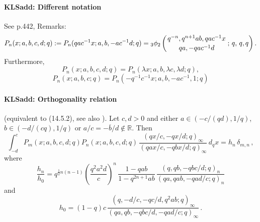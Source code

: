 \documentclass[envcountchap,graybox]{svmono}
\newcommand{\qhyp}[5]{\mbox{}_{#1}{\phi}_{#2}
\left(\genfrac{}{}{0pt}{}{#3}{#4}\,;\,q,\,#5\right)}
\newcommand\RR{\mathbb{R}}
\newcommand\de\delta
\newcommand\la\lambda
\newcommand\half{\frac12}
\newcommand\iy\infty
\newcommand{\qhyp}[5]{\,\mbox{}_{#1}\phi_{#2}\!\left(
  \genfrac{}{}{0pt}{}{#3}{#4};#5\right)}
\begin{document}
\paragraph{\large\bf KLSadd: Different notation}See p.442, Remarks:
\begin{equation}
P_n(x;a,b,c,d;q):=P_n(qac^{-1}x;a,b,-ac^{-1}d;q)
=\qhyp32{q^{-n},q^{n+1}ab,qac^{-1}x}{qa,-qac^{-1}d}{q,q}.
\label{123}
\end{equation}
Furthermore,
\begin{equation}
P_n(x;a,b,c,d;q)=P_n(\la x;a,b,\la c,\la d;q),
\label{141}
\end{equation}
\begin{equation}
P_n(x;a,b,c;q)=P_n(-q^{-1}c^{-1}x;a,b,-ac^{-1},1;q)
\label{142}
\end{equation}
%
\paragraph{\large\bf KLSadd: Orthogonality relation}(equivalent to (14.5.2), see also \cite[(2.42), (2.41), (2.36), (2.35)]{K17}).
Let $c,d>0$ and either $a\in (-c/(qd),1/q)$, $b\in(-d/(cq),1/q)$ or
$a/c=-\overline b/d\notin\RR$. Then
\begin{equation}
\int_{-d}^c P_m(x;a,b,c,d;q) P_n(x;a,b,c,d;q)\,
\frac{(qx/c,-qx/d;q)_\iy}{(qax/c,-qbx/d;q)_\iy}\,d_qx=h_n\,\de_{m,n}\,,
\label{124}
\end{equation}
where
\begin{equation}
\frac{h_n}{h_0}=q^{\half n(n-1)}\left(\frac{q^2a^2d}c\right)^n\,
\frac{1-qab}{1-q^{2n+1}ab}\,
\frac{(q,qb,-qbc/d;q)_n}{(qa,qab,-qad/c;q)_n}
\label{125}
\end{equation}
and
\begin{equation}
h_0=(1-q)c\,\frac{(q,-d/c,-qc/d,q^2ab;q)_\iy}
{(qa,qb,-qbc/d,-qad/c;q)_\iy}\,.
\label{126}
\end{equation}
%
\end{document}
